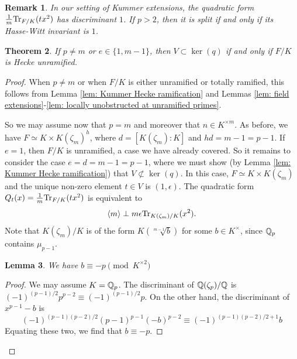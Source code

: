 \documentclass[11pt,a4paper]{amsart}
\def\Q{{\rm \mathbb{Q}}}
\def\Tr{{\rm Tr}}
\numberwithin{equation}{section}
\newtheorem{theorem}{Theorem}[section]
\newtheorem{lemma}[theorem]{Lemma}
\newtheorem{remark}[theorem]{Remark}
\begin{document}
\begin{remark}\label{rem: split quadratic form}
{\em
    In our setting of Kummer extensions, the quadratic form $\frac{1}{m}\Tr_{F/K}(tx^2)$ has discriminant $1$. If $p > 2$, then it is split if and only if its Hasse-Witt invariant is $1$.  
}
\end{remark}


\begin{theorem}\label{thm: local Kummer obstruction}
    If $p \neq m$ or $e \in \{1,m-1\}$, then $V \subset \ker(q)$ if and only if $F/K$ is Hecke unramified.  
\end{theorem}

\begin{proof}
    When $p\neq m$ or when $F/K$ is either unramified or totally ramified, this follows from Lemma \ref{lem: Kummer Hecke ramification} and Lemmas \ref{lem: field extensions}-\ref{lem: locally unobstructed at unramified primes}. 
    
    So we may assume now that $p = m$ and moreover that $n \in K^{\times m}$. As before, we have $F \simeq K \times K(\zeta_m)^h$, where $d = [K(\zeta_m) \colon K]$ and $hd = m-1 = p-1$.  If $e = 1$, then $F/K$ is unramified, a case we have already covered. So it remains to consider the case $e = d = m-1 = p-1$, where we must show (by Lemma \ref{lem: Kummer Hecke ramification}) that $V \not\subset \ker(q)$. In this case, $F \simeq K \times K(\zeta_m)$ and the unique  non-zero element $t \in V$ is $(1,\epsilon)$. The quadratic form $Q_t(x) = \frac{1}{m}\Tr_{F/K}(tx^2)$ is equivalent to 
    \[\langle m\rangle  \perp m\epsilon \Tr_{K(\zeta_m)/K}(x^2).\]
    Note that $K(\zeta_m)/K$ is of the form $K(\sqrt[m-1]{b})$ for some $b \in K^\times$, since $\Q_p$ contains $\mu_{p-1}$. 
    \begin{lemma}\label{lem: cyclotomic kummer}
        We have $b \equiv -p \pmod{K^{\times2}}$
    \end{lemma}
    \begin{proof}
        We may assume $K = \Q_p$. The discriminant of $\Q(\zeta_p)/\Q$ is $(-1)^{(p-1)/2}p^{p-2} \equiv (-1)^{(p-1)/2} p$. On the other hand, the discriminant of $x^{p-1} - b$ is 
        \[(-1)^{(p-1)(p-2)/2}(p-1)^{p-1}(-b)^{p-2} \equiv (-1)^{(p-1)(p-2)/2 + 1}b\] 
        Equating these two, we find that $b \equiv -p$. 
    \end{proof} 
    

\end{proof}
\end{document}
